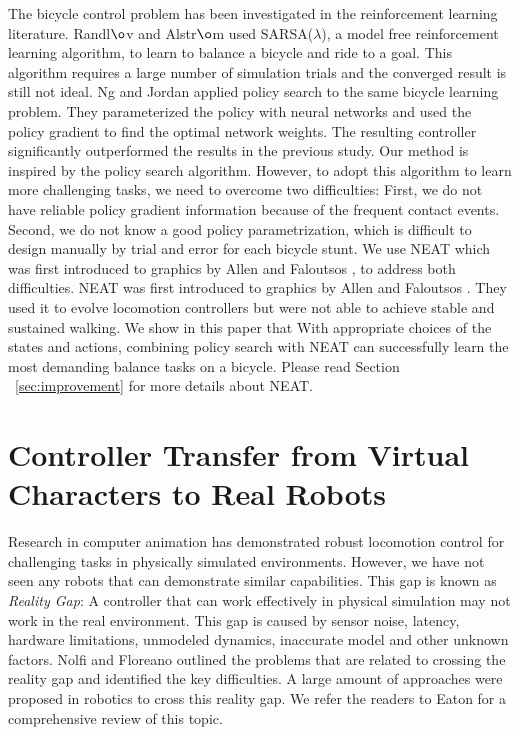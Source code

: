 The bicycle control problem has been investigated in the reinforcement learning literature. Randl$\o$v and Alstr$\o$m \cite{RandlovAlstrom:1998} used SARSA($\lambda$), a model free reinforcement learning algorithm, to learn to balance a bicycle and ride to a goal. This algorithm requires a large number of simulation trials and the converged result is still not ideal. Ng and Jordan \cite{Ng:2000:PPS} applied policy search to the same bicycle learning problem. They parameterized the policy with neural networks and used the policy gradient to find the optimal network weights. The resulting controller significantly outperformed the results in the previous study. Our method is inspired by the policy search algorithm. However, to adopt this algorithm to learn more challenging tasks, we need to overcome two difficulties: First, we do not have reliable policy gradient information because of the frequent contact events. Second, we do not know a good policy parametrization, which is difficult to design manually by trial and error for each bicycle stunt. We use NEAT \cite{Stanley:2002:ENN} which was first introduced to graphics by Allen and Faloutsos \cite{Allen2009}, to address both difficulties. NEAT was first introduced to graphics by Allen and Faloutsos \cite{Allen2009}. They used it to evolve locomotion controllers but were not able to achieve stable and sustained walking. We show in this paper that With appropriate choices of the states and actions, combining policy search with NEAT can successfully learn the most demanding balance tasks on a bicycle. Please read Section ~\ref{sec:improvement} for more details about NEAT.

\section{Controller Transfer from Virtual Characters to Real Robots}
Research in computer animation has demonstrated robust locomotion control for challenging tasks in physically simulated environments. However, we have not seen any robots that can demonstrate similar capabilities. This gap is known as \emph{Reality Gap}: A controller that can work effectively in physical simulation may not work in the real environment. This gap is caused by sensor noise, latency, hardware limitations, unmodeled dynamics, inaccurate model and other unknown factors. Nolfi and Floreano \cite{Nolfi:2000} outlined the problems that are related to crossing the reality gap and identified the key difficulties. A large amount of approaches were proposed in robotics to cross this reality gap. We refer the readers to Eaton \cite{Eaton:2015} for a comprehensive review of this topic.

